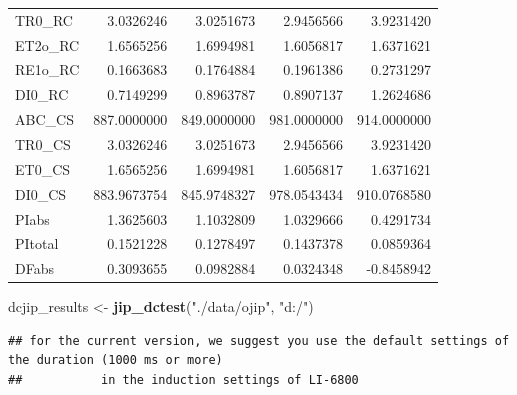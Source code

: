 \documentclass[]{krantz}
\makeatletter
\newenvironment{Shaded}{\begin{snugshade}}{\end{snugshade}}
\newcommand{\KeywordTok}[1]{\textcolor[rgb]{0.13,0.29,0.53}{\textbf{#1}}}
\newcommand{\StringTok}[1]{\textcolor[rgb]{0.31,0.60,0.02}{#1}}
\newcommand{\NormalTok}[1]{#1}
\newenvironment{kframe}{%
\medskip{}
\setlength{\fboxsep}{.8em}
 \def\at@end@of@kframe{}%
 \ifinner\ifhmode%
  \def\at@end@of@kframe{\end{minipage}}%
  \begin{minipage}{\columnwidth}%
 \fi\fi%
 \def\FrameCommand##1{\hskip\@totalleftmargin \hskip-\fboxsep
 \colorbox{shadecolor}{##1}\hskip-\fboxsep
     \hskip-\linewidth \hskip-\@totalleftmargin \hskip\columnwidth}%
 \MakeFramed {\advance\hsize-\width
   \@totalleftmargin\z@ \linewidth\hsize
   \@setminipage}}%
 {\par\unskip\endMakeFramed%
 \at@end@of@kframe}
\renewenvironment{Shaded}{\begin{kframe}}{\end{kframe}}
\theoremstyle{definition}
\theoremstyle{definition}
\theoremstyle{definition}
\theoremstyle{remark}
\makeatother
\begin{document}
\begin{longtable}{lrrrr}
TR0\_RC & 3.0326246 & 3.0251673 & 2.9456566 & 3.9231420\\
ET2o\_RC & 1.6565256 & 1.6994981 & 1.6056817 & 1.6371621\\
\addlinespace
RE1o\_RC & 0.1663683 & 0.1764884 & 0.1961386 & 0.2731297\\
DI0\_RC & 0.7149299 & 0.8963787 & 0.8907137 & 1.2624686\\
ABC\_CS & 887.0000000 & 849.0000000 & 981.0000000 & 914.0000000\\
TR0\_CS & 3.0326246 & 3.0251673 & 2.9456566 & 3.9231420\\
ET0\_CS & 1.6565256 & 1.6994981 & 1.6056817 & 1.6371621\\
\addlinespace
DI0\_CS & 883.9673754 & 845.9748327 & 978.0543434 & 910.0768580\\
PIabs & 1.3625603 & 1.1032809 & 1.0329666 & 0.4291734\\
PItotal & 0.1521228 & 0.1278497 & 0.1437378 & 0.0859364\\
DFabs & 0.3093655 & 0.0982884 & 0.0324348 & -0.8458942\\
\bottomrule
\end{longtable}

\begin{Shaded}
\begin{Highlighting}[]
\NormalTok{dcjip_results <-}\StringTok{ }\KeywordTok{jip_dctest}\NormalTok{(}\StringTok{"./data/ojip"}\NormalTok{, }\StringTok{"d:/"}\NormalTok{)}
\end{Highlighting}
\end{Shaded}

\begin{verbatim}
## for the current version, we suggest you use the default settings of the duration (1000 ms or more)
##           in the induction settings of LI-6800
\end{verbatim}
\end{document}
